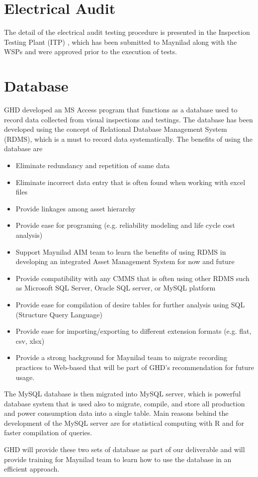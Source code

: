 

\section{Electrical Audit}
The detail of the electrical audit testing procedure is presented in the Inspection Testing Plant (ITP) \cite{GHD2018j}, which has been submitted to Maynilad along with the WSPs and were approved prior to the execution of tests.

\section{Database}
\label{24}
GHD developed an MS Access program that functions as a database used to record data collected from visual inspections and testings. The database has been developed using the concept of Relational Database Management System (RDMS), which is a must to record data systematically. The benefits of using the database are

\begin{itemize}
	\item Eliminate redundancy and repetition of same data
	\item Eliminate incorrect data entry that is often found when working with excel files
	\item Provide linkages among asset hierarchy
	\item Provide ease for programing (e.g. reliability modeling and life cycle cost analysis)
	\item Support Maynilad AIM team to learn the benefits of using RDMS in developing an integrated Asset Management System for now and future
	\item Provide compatibility with any CMMS that is often using other RDMS such as Microsoft SQL Server, Oracle SQL server, or MySQL platform
	\item Provide ease for compilation of desire tables for further analysis using SQL (Structure Query Language)
	\item Provide ease for importing/exporting to different extension formats (e.g. flat, csv, xlsx)
	\item Provide a strong background for Maynilad team to migrate recording practices to Web-based that will be part of GHD's recommendation for future usage.
\end{itemize}

The MySQL database is then migrated into MySQL server, which is powerful database system that is used also to migrate, compile, and store all production and power consumption data into a single table. Main reasons behind the development of the MySQL server are for statistical computing with R and for faster compilation of queries.

GHD will provide these two sets of database as part of our deliverable and will provide training for Maynilad team to learn how to use the database in an efficient approach.




